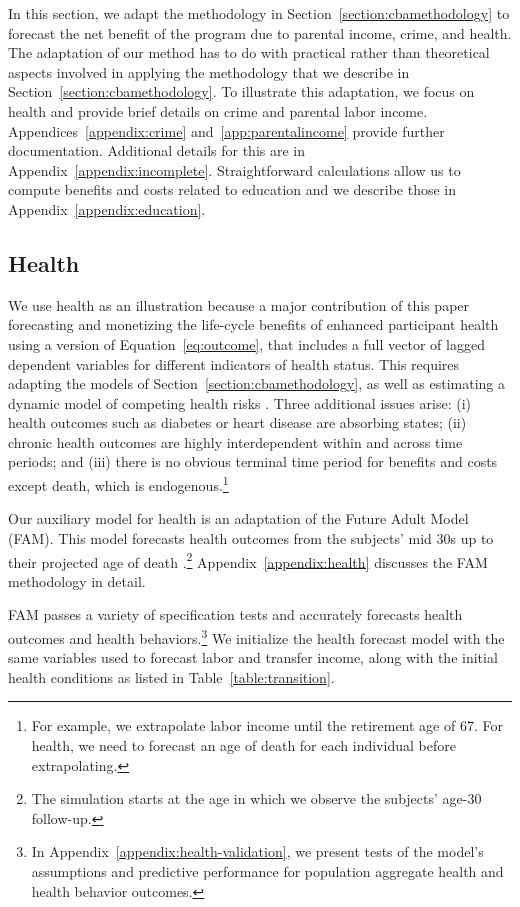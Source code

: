 In this section, we adapt the methodology in Section~\ref{section:cbamethodology} to forecast the net benefit of the program due to parental income, crime, and health. The adaptation of our method has to do with practical rather than theoretical aspects involved in applying the methodology that we describe in Section~\ref{section:cbamethodology}. To illustrate this adaptation, we focus on health and provide brief details on crime and parental labor income. Appendices~\ref{appendix:crime} and~\ref{app:parentalincome} provide further documentation. Additional details for this are in Appendix~\ref{appendix:incomplete}. Straightforward calculations allow us to compute benefits and costs related to education and we describe those in Appendix~\ref{appendix:education}.

\subsection{Health}

We use health as an illustration because a major contribution of this paper forecasting and monetizing the life-cycle benefits of enhanced participant health using a version of Equation~\eqref{eq:outcome}, that includes a full vector of lagged dependent variables for different indicators of health status. This requires adapting the models of Section~\ref{section:cbamethodology}, as well as estimating a dynamic model of competing health risks \citep{Kalbfleisch_Prentice_1980_failure}. Three additional issues arise: (i) health outcomes such as diabetes or heart disease are absorbing states; (ii) chronic health outcomes are highly interdependent within and across time periods; and (iii) there is no obvious terminal time period for benefits and costs except death, which is endogenous.\footnote{For example, we extrapolate labor income until the retirement age of 67. For health, we need to forecast an age of death for each individual before extrapolating.}

Our auxiliary model for health is an adaptation of the Future Adult Model (FAM). This model forecasts health outcomes from the subjects' mid 30s up to their projected age of death \citep{Goldman_etal_2015_Future-Elderly-Model-Report}.\footnote{The simulation starts at the age in which we observe the subjects' age-30 follow-up.}  Appendix~\ref{appendix:health} discusses the FAM methodology in detail.

FAM passes a variety of specification tests and accurately forecasts health outcomes and health behaviors.\footnote{In Appendix~\ref{appendix:health-validation}, we present tests of the model's assumptions and predictive performance for population aggregate health and health behavior outcomes.} We initialize the health forecast model with the same variables used to forecast labor and transfer income, along with the initial health conditions as listed in Table~\ref{table:transition}.

